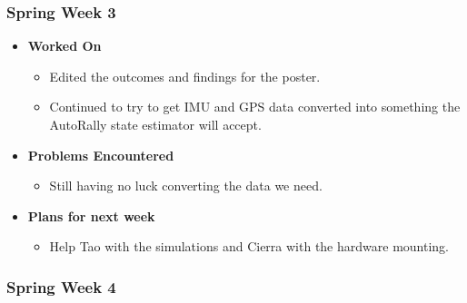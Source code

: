 \documentclass[compsoc,draftclsnofoot,onecolumn,10pt]{IEEEtran}
\begin{document}
\subsubsection{Spring Week 3}
\begin{itemize}
    \item {\textbf{Worked On}}
    \begin{itemize}
        \item Edited the outcomes and findings for the poster.
        \item Continued to try to get IMU and GPS data converted into something the AutoRally state estimator will accept.
    \end{itemize}

    \item {\textbf{Problems Encountered}}
    \begin{itemize}
        \item Still having no luck converting the data we need.
    \end{itemize}

    \item{\textbf{Plans for next week}}
    \begin{itemize}
        \item Help Tao with the simulations and Cierra with the hardware mounting.
    \end{itemize}
\end{itemize}

\subsubsection{Spring Week 4}
\end{document}
